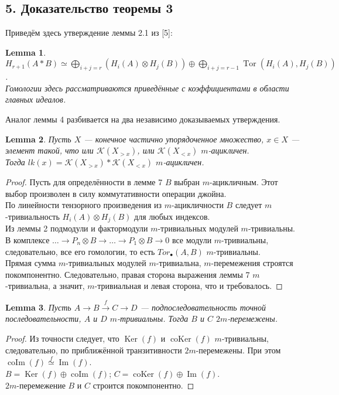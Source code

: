 \documentclass[a4paper, 12pt]{article}
\newtheorem{lemma}{Lemma}
\theoremstyle{definition}
\theoremstyle{remark}
\begin{document}
\subsection*{5. Доказательство теоремы 3}

Приведём здесь утверждение леммы 2.1 из [5]:\\
\begin{lemma}
  $H_{r+1}(A * B) \simeq \bigoplus_{i+j=r}(H_i(A) \otimes H_j(B)) \oplus \bigoplus_{i+j=r-1} \operatorname{Tor}(H_i(A),H_j(B))$.\\
  Гомологии здесь рассматриваются приведённые с коэффициентами в области главных идеалов.
\end{lemma}

Аналог леммы 4 разбивается на два независимо доказываемых утверждения.\\

\begin{lemma}
  Пусть $X$ --- конечное частично упорядоченное множество, $x \in X$ --- элемент такой, что или $\mathcal{K}(X_{>x})$, или $\mathcal{K}(X_{<x})$ $m$-ацикличен.\\
  Тогда $lk(x) = \mathcal{K}(X_{>x}) * \mathcal{K}(X_{<x})$ $m$-ацикличен.
\end{lemma}
\begin{proof}
  Пусть для определённости в лемме 7 $B$ выбран $m$-ацикличным. Этот выбор произволен в силу коммутативности операции джойна.\\
  По линейности тензорного произведения из $m$-ацикличности $B$ следует $m$-тривиальность $H_i(A) \otimes H_j(B)$ для любых индексов.\\
  Из леммы 2 подмодули и фактормодули $m$-тривиальных модулей $m$-тривиальны.\\
  В комплексе $\ldots \to P_n \otimes B \to \ldots \to P_1 \otimes B \to 0$ все модули $m$-тривиальны, следовательно, все его гомологии, то есть $Tor_{\bullet}(A,B)$ $m$-тривиальны.\\
  Прямая сумма $m$-тривиальных модулей $m$-тривиальна, $m$-перемежения строятся покомпонентно. Следовательно, правая сторона выражения леммы 7 $m$-тривиальна, а значит, $m$-тривиальная и левая сторона, что и требовалось.
\end{proof}

\begin{lemma}
  Пусть $A \to B \xrightarrow{f} C \to D$ --- подпоследовательность точной последовательности, $A$ и $D$ $m$-тривиальны. Тогда $B$ и $C$ $2m$-перемежены.
\end{lemma}
\begin{proof}
  Из точности следует, что $\operatorname{Ker}(f)$ и $\operatorname{coKer}(f)$ $m$-тривиальны, следовательно, по приближённой транзитивности $2m$-перемежены. При этом $\operatorname{coIm}(f) \stackrel{f}{\simeq} \operatorname{Im}(f)$.\\
  $B = \operatorname{Ker}(f) \oplus \operatorname{coIm}(f)$; $C = \operatorname{coKer}(f) \oplus \operatorname{Im}(f)$.\\
  $2m$-перемежение $B$ и $C$ строится покомпонентно.
\end{proof}
\end{document}
